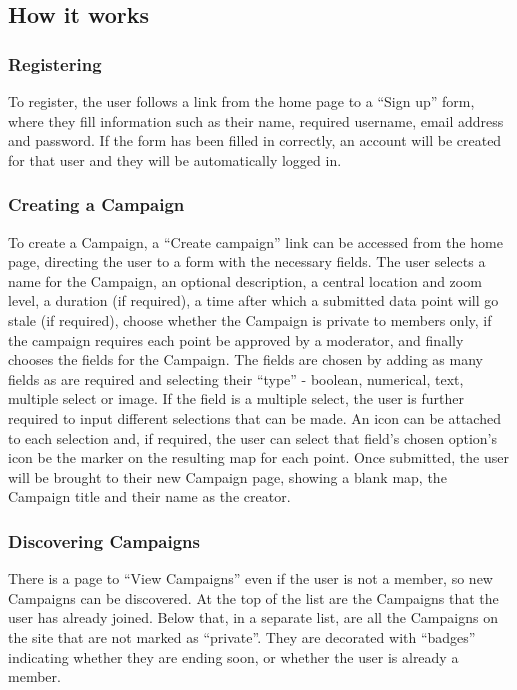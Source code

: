 \documentclass{article}
\begin{document}
		\subsection{How it works}

		\subsubsection{Registering}
		To register, the user follows a link from the home page to a ``Sign up'' form, where they fill information such as their name, required username, email address and password. If the form has been filled in correctly, an account will be created for that user and they will be automatically logged in.

		\subsubsection{Creating a Campaign}
		To create a Campaign, a ``Create campaign'' link can be accessed from the home page, directing the user to a form with the necessary fields. The user selects a name for the Campaign, an optional description, a central location and zoom level, a duration (if required), a time after which a submitted data point will go stale (if required), choose whether the Campaign is private to members only, if the campaign requires each point be approved by a moderator, and finally chooses the fields for the Campaign. The fields are chosen by adding as many fields as are required and selecting their ``type'' - boolean, numerical, text, multiple select or image. If the field is a multiple select, the user is further required to input different selections that can be made. An icon can be attached to each selection and, if required, the user can select that field's chosen option's icon be the marker on the resulting map for each point. Once submitted, the user will be brought to their new Campaign page, showing a blank map, the Campaign title and their name as the creator.

		\subsubsection{Discovering Campaigns}
		There is a page to ``View Campaigns'' even if the user is not a member, so new Campaigns can be discovered. At the top of the list are the Campaigns that the user has already joined. Below that, in a separate list, are all the Campaigns on the site that are not marked as ``private''. They are decorated with ``badges'' indicating whether they are ending soon, or whether the user is already a member.
\end{document}
